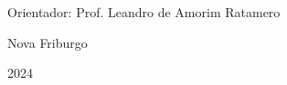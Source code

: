\begin{titlepage}
    \vspace{1.5cm}

    \begin{flushleft}
        \begin{minipage}{0.5\textwidth}
            \large
            \raggedright
            Orientador: Prof. Leandro de Amorim Ratamero
        \end{minipage}
    \end{flushleft}


    \vfill %

    {\large Nova Friburgo \par}
    \vspace{0.3cm}
    {\large 2024 \par}
\end{titlepage}
\newpage %
